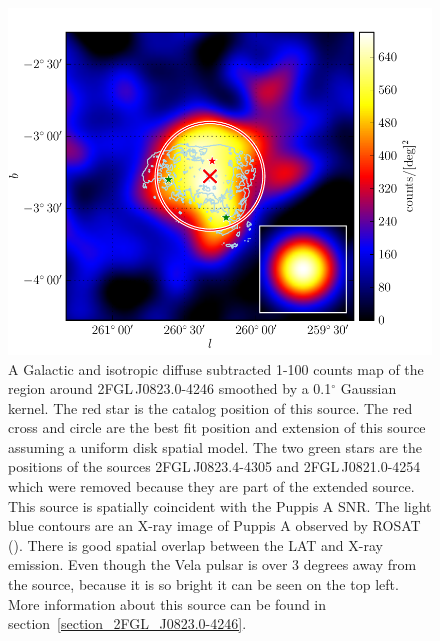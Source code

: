 \documentclass[12pt,preprint]{aastex}
\newcommand{\gev}{\text{GeV}\xspace}
\renewcommand{\deg}{\ensuremath{^\circ}\xspace}
\begin{document}
\begin{figure}
  \begin{center}
    \includegraphics[type=pdf,ext=.pdf,read=.pdf]{source_plots/source_1FGL_J0823.3-4248}
  \end{center}
  \caption{A Galactic and isotropic diffuse subtracted 1-100
  \gev counts map of the region around 2FGL\,J0823.0-4246 smoothed by a
  0.1\deg Gaussian kernel.  The red star is the catalog position of this source.  
  The red cross and circle are the best fit position
  and extension of this source assuming a uniform disk spatial model.
  The two green stars are the positions of the sources 2FGL\,J0823.4-4305
  and 2FGL\,J0821.0-4254 which were removed because they are part of the
  extended source.  This source is spatially coincident with the Puppis
  A SNR. The light blue contours are an X-ray image of Puppis A observed by
  ROSAT (\cite{rosat_puppis_a}). There is good spatial overlap between
  the LAT and X-ray emission.  Even though the Vela pulsar is over 3
  degrees away from the source, because it is so bright it can be seen
  on the top left.  More information about this source can be found in 
  section~\ref{section_2FGL_J0823.0-4246}.
  }\label{1FGL_J0823.3-4248}
\end{figure}
\end{document}

